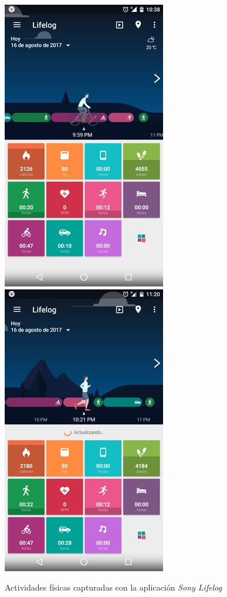 \begin{figure}[th]
\begin{centering}
\includegraphics[scale=0.6]{capitulo-6/graphics/lifelog1} \includegraphics[scale=0.6]{capitulo-6/graphics/lifelog2}
\par\end{centering}
\caption[Verificación de actividades con \emph{Sony Lifelog}]{\label{fig6:vlifelog}Actividades físicas capturadas con la aplicación
\emph{Sony Lifelog}}
\end{figure}

